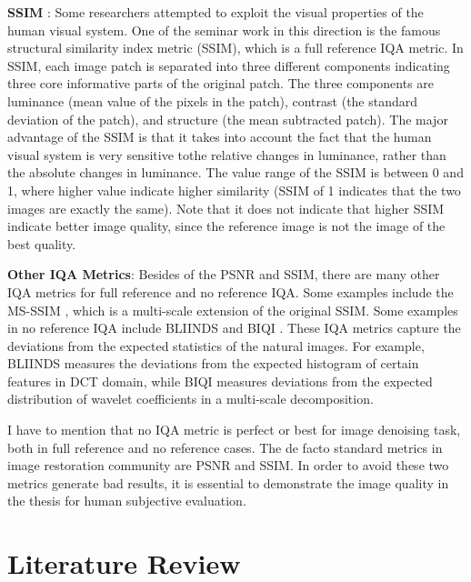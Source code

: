 \textbf{SSIM} \cite{ssim}: Some researchers attempted to exploit the visual properties of the human visual system. One of the seminar work in this direction is the famous structural similarity index metric (SSIM), which is a full reference IQA metric. In SSIM, each image patch is separated into three different components indicating three core informative parts of the original patch. The three components are luminance (mean value of the pixels in the patch), contrast (the standard deviation of the patch), and structure (the mean subtracted patch). The major advantage of the SSIM is that it takes into account the fact that the human visual system is very sensitive tothe relative changes in luminance, rather than the absolute changes in luminance. The value range of the SSIM is between 0 and 1, where higher value indicate higher similarity (SSIM of 1 indicates that the two images are exactly the same). Note that it does not indicate that higher SSIM indicate better image quality, since the reference image is not the image of the best quality. 

\textbf{Other IQA Metrics}: Besides of the PSNR and SSIM, there are many other IQA metrics for full reference and no reference IQA. Some examples include the MS-SSIM \cite{msssim}, which is a multi-scale extension of the original SSIM. Some examples in no reference IQA include BLIINDS \cite{bliinds} and BIQI \cite{biqi}. These IQA metrics capture the deviations from the expected statistics of the natural images. For example, BLIINDS measures the deviations from the expected histogram of certain features in DCT domain, while BIQI measures deviations from the expected distribution of wavelet coefficients in a multi-scale decomposition.

I have to mention that no IQA metric is perfect or best for image denoising task, both in full reference and no reference cases. The de facto standard metrics in image restoration community are PSNR and SSIM. In order to avoid these two metrics generate bad results, it is essential to demonstrate the image quality in the thesis for human subjective evaluation.


\section{Literature Review}

